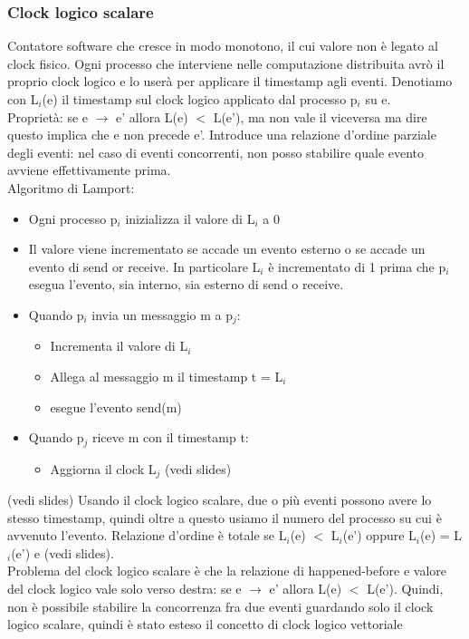 \documentclass{article}
\begin{document}
\subsubsection{Clock logico scalare}
Contatore software che cresce in modo monotono, il cui valore non è legato al clock fisico. Ogni processo che interviene nelle computazione distribuita avrò il proprio clock logico e lo userà per applicare il timestamp agli eventi. Denotiamo con L$_i$(e) il timestamp sul clock logico applicato dal processo p$_i$ su e.\\ Proprietà: se e $\rightarrow$ e' allora L(e) $<$ L(e'), ma non vale il viceversa ma dire questo implica che e non precede e'. Introduce una relazione d'ordine parziale degli eventi: nel caso di eventi concorrenti, non posso stabilire quale evento avviene effettivamente prima.\\ Algoritmo di Lamport:
\begin{itemize}
\item Ogni processo p$_i$ inizializza il valore di L$_i$ a 0
\item Il valore viene incrementato se accade un evento esterno o se accade un evento di send or receive. In particolare L$_i$ è incrementato di 1 prima che p$_i$ esegua l'evento, sia interno, sia esterno di send o receive.
\item Quando p$_i$ invia un messaggio m a p$_j$:
\begin{itemize}
\item Incrementa il valore di L$_i$
\item Allega al messaggio m il timestamp t = L$_i$
\item esegue l'evento send(m)
\end{itemize}
\item Quando p$_j$ riceve m con il timestamp t:
\begin{itemize}
\item Aggiorna il clock L$_j$ (vedi slides)
\end{itemize}
\end{itemize}
(vedi slides)
Usando il clock logico scalare, due o più eventi possono avere lo stesso timestamp, quindi oltre a questo usiamo il numero del processo su cui è avvenuto l'evento. Relazione d'ordine è totale se L$_i$(e) $<$ L$_i$(e') oppure L$_i$(e) = L$_i$(e') e (vedi slides).\\ Problema del clock logico scalare è che la relazione di happened-before e valore del clock logico vale solo verso destra: se e $\rightarrow$ e' allora L(e) $<$ L(e'). Quindi, non è possibile stabilire la concorrenza fra due eventi guardando solo il clock logico scalare, quindi è stato esteso il concetto di clock logico vettoriale
\end{document}
